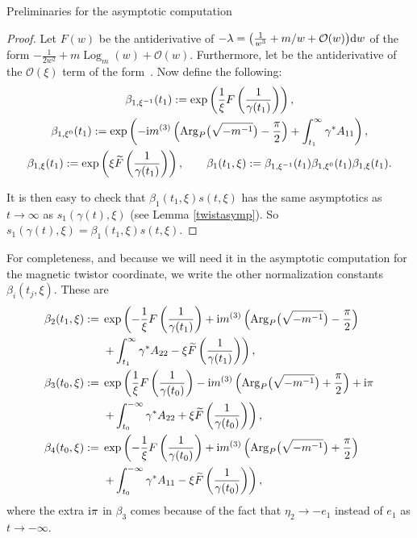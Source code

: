 \begin{subsubsection}{Preliminaries for the asymptotic computation}
\begin{proof}
Let $F(w)$ be the antiderivative of $-\lambda=\bigl(\frac{1}{w^3} +m/w +\mathcal{O}(w)\bigr){\rm d}w$ of the form $-\frac{1}{2w^2}+m\operatorname{Log}_{m}(w)+\mathcal{O}(w)$. Furthermore, let  be the antiderivative of the $\mathcal{O}(\xi)$ term of the form~. Now define the following:
\begin{gather*}
 \beta_{1,{\xi^{-1}}}(t_1):=\exp \left(\frac{1}{\xi}F\left(\frac{1}{\gamma(t_1)}\right)\right),\\
 \beta_{1,{\xi^{0}}}(t_1):=\exp \left(- {\rm i}m^{(3)}\left(\operatorname{Arg}_P\bigl(\sqrt{-m^{-1}}\bigr)-\frac{\pi}{2}\right)+\int_{t_1}^{\infty}\gamma^*A_{11}\right),\\
 \beta_{1,\xi}(t_1):=\exp \left(\xi \widetilde{F}\left(\frac{1}{\gamma(t_1)}\right)\right),\qquad
 \beta_1(t_1,\xi):=\beta_{1,{\xi^{-1}}}(t_1)\beta_{1,{\xi^{0}}}(t_1)\beta_{1,\xi}(t_1).
\end{gather*}

It is then easy to check that $\beta_1(t_1,\xi)s(t,\xi)$ has the same asymptotics as $t\to \infty$ as $s_1(\gamma(t),\xi)$ (see Lemma \ref{twistasymp}). So $s_1(\gamma(t),\xi)=\beta_1(t_1,\xi)s(t,\xi)$.
\end{proof}

For completeness, and because we will need it in the asymptotic computation for the magnetic twistor coordinate, we write the other normalization constants $\beta_i(t_j,\xi)$. These are
\begin{align*}
 \beta_2(t_1,\xi):={}&\exp \left(-\frac{1}{\xi}F\left(\frac{1}{\gamma(t_1)}\right) +{\rm i}m^{(3)}\left(\operatorname{Arg}_P\bigl(\sqrt{-m^{-1}}\bigr)-\frac{\pi}{2}\right)\right.\\
 &\left.+\int_{t_1}^{\infty}\gamma^*A_{22} - \xi \widetilde{F}\left(\frac{1}{\gamma(t_1)}\right)\right),\\
 \beta_3(t_0,\xi):={}&\exp \left(\frac{1}{\xi}F\left(\frac{1}{\gamma(t_0)}\right)- {\rm i}m^{(3)}\left(\operatorname{Arg}_P\bigl(\sqrt{-m^{-1}}\bigr)+\frac{\pi}{2}\right)+{\rm i}\pi\right.\\
&\left.+\int_{t_0}^{-\infty}\gamma^*A_{22} + \xi \widetilde{F}\left(\frac{1}{\gamma(t_0)}\right)\right),\\
 \beta_4(t_0,\xi):={}&\exp \left(-\frac{1}{\xi}F\left(\frac{1}{\gamma(t_0)}\right) +{\rm i}m^{(3)}\left(\operatorname{Arg}_P\bigl(\sqrt{-m^{-1}}\bigr)+\frac{\pi}{2}\right)\right.\\
& \left.+\int_{t_0}^{-\infty}\gamma^*A_{11} - \xi \widetilde{F}\left(\frac{1}{\gamma(t_0)}\right)\right),
\end{align*}
where the extra ${\rm i}\pi$ in $\beta_3$ comes because of the fact that $\eta_2 \to -e_1$ instead of $e_1$ as $t\to -\infty$.


\end{subsubsection}
